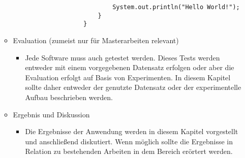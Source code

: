 \begin{itemize}
\begin{itemize}
\begin{itemize}
\begin{lstlisting}
						System.out.println("Hello World!");
					}
				}
				\end{lstlisting} 
			\end{itemize}
		\item Evaluation (zumeist nur für Masterarbeiten relevant)
		\begin{itemize}
			\item Jede Software muss auch getestet werden. Dieses Tests werden entweder mit einem vorgegebenen Datensatz erfolgen oder aber die Evaluation erfolgt auf Basis von Experimenten. In diesem Kapitel sollte daher entweder der genutzte Datensatz oder der experimentelle Aufbau beschrieben werden. 
		\end{itemize}
		\item Ergebnis und Diskussion
		\begin{itemize}
			\item Die Ergebnisse der Anwendung werden in diesem Kapitel vorgestellt und anschließend diskutiert. Wenn möglich sollte die Ergebnisse in Relation zu bestehenden Arbeiten in dem Bereich erörtert werden.
		\end{itemize}
	\end{itemize}  
\end{itemize}